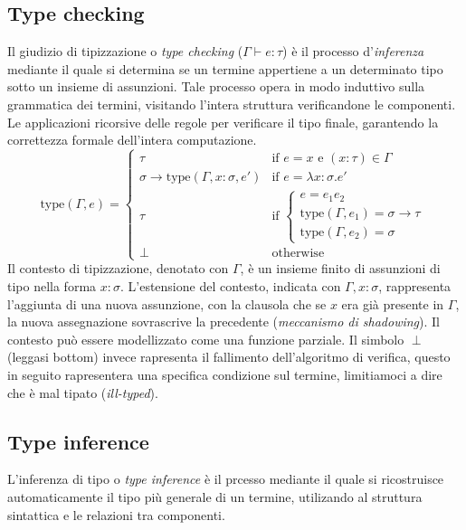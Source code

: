 \subsection{Type checking}
Il giudizio di tipizzazione o \emph{type checking} ($\Gamma \vdash e : \tau$) è il processo d'\emph{inferenza} mediante il quale si determina se un termine appertiene a un determinato tipo sotto un insieme di assunzioni.
Tale processo opera in modo induttivo sulla grammatica dei termini, visitando l'intera struttura verificandone le componenti. Le applicazioni ricorsive delle regole per verificare il tipo finale,
garantendo la correttezza formale dell'intera computazione.
\begin{equation}
    \text{type}(\Gamma, e) = 
    \begin{cases} 
        \tau & \text{if } e = x \text{ e } (x : \tau) \in \Gamma \\
        \sigma \to \text{type}(\Gamma, x:\sigma, e') & \text{if } e = \lambda x : \sigma . e' \\
        \tau & \text{if } 
            \begin{cases} 
            e = e_1 e_2 \\
            \text{type}(\Gamma, e_1) = \sigma \to \tau \\
            \text{type}(\Gamma, e_2) = \sigma 
            \end{cases} \\
        \perp & \text{otherwise}
    \end{cases}
    \label{eq:simple_typed_lambda_type_cheking_algorithm}
\end{equation}
Il contesto di tipizzazione, denotato con $\Gamma$, è un insieme finito di assunzioni di tipo nella forma $x : \sigma$.
L'estensione del contesto, indicata con $\Gamma, x : \sigma$, rappresenta l'aggiunta di una nuova assunzione, con la clausola 
che se $x$ era già presente in $\Gamma$, la nuova assegnazione sovrascrive la precedente (\emph{meccanismo di shadowing}). Il contesto
può essere modellizzato come una funzione parziale. Il simbolo $\perp$ (leggasi bottom) invece rapresenta il fallimento dell'algoritmo
di verifica, questo in seguito rapresentera una specifica condizione sul termine, limitiamoci a dire che è mal tipato (\emph{ill-typed}).

\subsection{Type inference}
L'inferenza di tipo o \emph{type inference}  è il prcesso mediante il quale si ricostruisce automaticamente il tipo più generale di un termine,
utilizando al struttura sintattica e le relazioni tra componenti.

